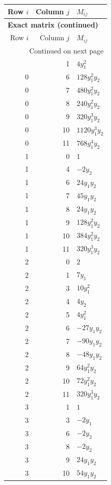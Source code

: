 \documentclass[10pt,a4paper]{article}
\begin{document}
{\small\setlength{\tabcolsep}{7pt}\begin{longtable}{rrp{125mm}}
\toprule Row $i$ & Column $j$ & $M_{ij}$\\\midrule\endfirsthead
\multicolumn{3}{l}{\textbf{Exact matrix (continued)}}\\
\toprule Row $i$ & Column $j$ & $M_{ij}$\\\midrule\endhead
\midrule\multicolumn{3}{r}{Continued on next page}\\\endfoot\bottomrule\endlastfoot
0 & 1 & $4 y_{1}^{2}$\\
0 & 6 & $128 y_{1}^{2} y_{2}$\\
0 & 7 & $480 y_{1}^{2} y_{2}$\\
0 & 8 & $240 y_{1}^{2} y_{2}$\\
0 & 9 & $320 y_{1}^{3} y_{2}$\\
0 & 10 & $1120 y_{1}^{3} y_{2}$\\
0 & 11 & $768 y_{1}^{4} y_{2}$\\
1 & 0 & $1$\\
1 & 4 & $- 2 y_{2}$\\
1 & 6 & $24 y_{1} y_{2}$\\
1 & 7 & $45 y_{1} y_{2}$\\
1 & 8 & $24 y_{1} y_{2}$\\
1 & 9 & $128 y_{1}^{2} y_{2}$\\
1 & 10 & $384 y_{1}^{2} y_{2}$\\
1 & 11 & $320 y_{1}^{3} y_{2}$\\
2 & 0 & $2$\\
2 & 1 & $7 y_{1}$\\
2 & 3 & $10 y_{1}^{2}$\\
2 & 4 & $4 y_{2}$\\
2 & 5 & $4 y_{1}^{2}$\\
2 & 6 & $- 27 y_{1} y_{2}$\\
2 & 7 & $- 90 y_{1} y_{2}$\\
2 & 8 & $- 48 y_{1} y_{2}$\\
2 & 9 & $64 y_{1}^{2} y_{2}$\\
2 & 10 & $72 y_{1}^{2} y_{2}$\\
2 & 11 & $320 y_{1}^{3} y_{2}$\\
3 & 1 & $1$\\
3 & 3 & $- 2 y_{1}$\\
3 & 6 & $- 2 y_{2}$\\
3 & 8 & $- 2 y_{2}$\\
3 & 9 & $24 y_{1} y_{2}$\\
3 & 10 & $54 y_{1} y_{2}$\\

\end{longtable}}
\end{document}
